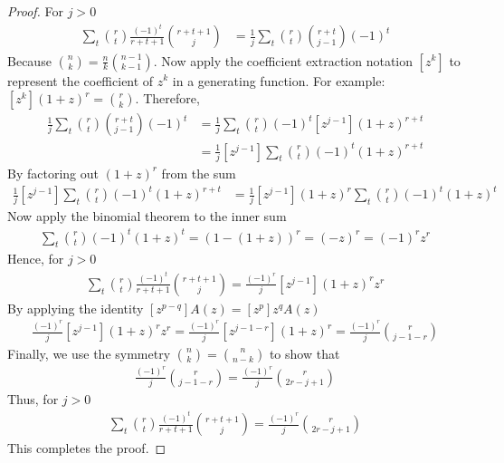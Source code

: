 \begin{lemma}
\begin{proof}
        For $j > 0$
        \begin{align*}
            \sum_t \binom{r}{t} \frac{(-1)^t}{r+t+1} \binom{r+t+1}{j}
            &= \frac{1}{j} \sum_t \binom{r}{t} \binom{r+t}{j-1} (-1)^t
        \end{align*}
        Because $\binom{n}{k} = \frac{n}{k} \binom{n-1}{k-1}$.
        Now apply the coefficient extraction notation $[z^k]$ to represent the coefficient of $z^k$
        in a generating function.
        For example: $[z^k] (1+z)^r = \binom{r}{k}$.
        Therefore,
        \begin{align*}
            \frac{1}{j} \sum_t \binom{r}{t} \binom{r+t}{j-1} (-1)^t
            &= \frac{1}{j} \sum_t \binom{r}{t} (-1)^t [z^{j-1}] (1+z)^{r+t} \\
            &= \frac{1}{j} [z^{j-1}] \sum_t \binom{r}{t} (-1)^t (1+z)^{r+t}
        \end{align*}
        By factoring out $(1+z)^r$ from the sum
        \begin{align*}
            \frac{1}{j} [z^{j-1}] \sum_t \binom{r}{t} (-1)^t (1+z)^{r+t}
            &= \frac{1}{j} [z^{j-1}] (1+z)^r \sum_t \binom{r}{t} (-1)^t (1+z)^t
        \end{align*}
        Now apply the binomial theorem to the inner sum
        \begin{align*}
            \sum_t \binom{r}{t} (-1)^t (1+z)^t = \left(1 - (1+z)\right)^r = (-z)^r = (-1)^r z^r
        \end{align*}
        Hence, for $j>0$
        \begin{align*}
            \sum_t \binom{r}{t} \frac{(-1)^t}{r+t+1} \binom{r+t+1}{j} = \frac{(-1)^r}{j} [z^{j-1}] (1+z)^r z^r
        \end{align*}
        By applying the identity $[z^{p-q}]A(z)=[z^p]z^qA(z)$
        \begin{align*}
            \frac{(-1)^r}{j}  [z^{j-1}] (1+z)^r z^r = \frac{(-1)^r}{j}  [z^{j-1-r}] (1+z)^r = \frac{(-1)^r}{j} \binom{r}{j - 1 - r}
        \end{align*}
        Finally, we use the symmetry $\binom{n}{k} = \binom{n}{n-k}$ to show that
        \begin{align*}
            \frac{(-1)^r}{j} \binom{r}{j - 1 - r} = \frac{(-1)^r}{j} \binom{r}{2r - j + 1}
        \end{align*}
        Thus, for $j > 0$
        \begin{align*}
            \sum_t \binom{r}{t} \frac{(-1)^t}{r+t+1} \binom{r+t+1}{j}
            = \frac{(-1)^r}{j} \binom{r}{2r - j + 1}
        \end{align*}
        This completes the proof.
    \end{proof}
\end{lemma}

